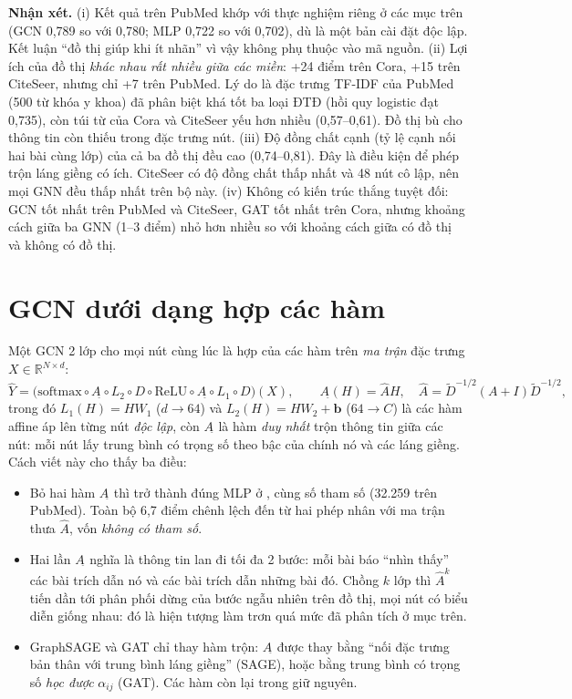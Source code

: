 \textbf{Nhận xét.} (i) Kết quả trên PubMed khớp với thực nghiệm riêng ở các mục trên (GCN 0,789 so với 0,780; MLP 0,722 so với 0,702), dù là một bản cài đặt độc lập. Kết luận ``đồ thị giúp khi ít nhãn'' vì vậy không phụ thuộc vào mã nguồn. (ii) Lợi ích của đồ thị \emph{khác nhau rất nhiều giữa các miền}: +24 điểm trên Cora, +15 trên CiteSeer, nhưng chỉ +7 trên PubMed. Lý do là đặc trưng TF-IDF của PubMed (500 từ khóa y khoa) đã phân biệt khá tốt ba loại ĐTĐ (hồi quy logistic đạt 0,735), còn túi từ của Cora và CiteSeer yếu hơn nhiều (0,57–0,61). Đồ thị bù cho thông tin còn thiếu trong đặc trưng nút. (iii) Độ đồng chất cạnh (tỷ lệ cạnh nối hai bài cùng lớp) của cả ba đồ thị đều cao (0,74–0,81). Đây là điều kiện để phép trộn láng giềng có ích. CiteSeer có độ đồng chất thấp nhất và 48 nút cô lập, nên mọi GNN đều thấp nhất trên bộ này. (iv) Không có kiến trúc thắng tuyệt đối: GCN tốt nhất trên PubMed và CiteSeer, GAT tốt nhất trên Cora, nhưng khoảng cách giữa ba GNN (1–3 điểm) nhỏ hơn nhiều so với khoảng cách giữa có đồ thị và không có đồ thị.

\section{GCN dưới dạng hợp các hàm}
\label{sec:ch6-compose}

Một GCN 2 lớp cho mọi nút cùng lúc là hợp của các hàm trên \emph{ma trận} đặc trưng $X\in\mathbb R^{N\times d}$:
\begin{equation}
\hat Y = \big(\mathrm{softmax}\circ A_{\hat{}}\circ L_2 \circ D \circ \mathrm{ReLU} \circ A_{\hat{}} \circ L_1 \circ D\big)(X),
\qquad A_{\hat{}}(H) = \hat A H,\quad \hat A = \tilde D^{-1/2}(A+I)\tilde D^{-1/2},
\label{eq:ch6-compose}
\end{equation}
trong đó $L_1(H)=HW_1$ ($d\to64$) và $L_2(H)=HW_2+\mathbf b$ ($64\to C$) là các hàm affine áp lên từng nút \emph{độc lập}, còn $A_{\hat{}}$ là hàm \emph{duy nhất} trộn thông tin giữa các nút: mỗi nút lấy trung bình có trọng số theo bậc của chính nó và các láng giềng. Cách viết này cho thấy ba điều:
\begin{itemize}
  \item Bỏ hai hàm $A_{\hat{}}$ thì  trở thành đúng MLP ở , cùng số tham số (32.259 trên PubMed). Toàn bộ 6,7 điểm chênh lệch đến từ hai phép nhân với ma trận thưa $\hat A$, vốn \emph{không có tham số}.
  \item Hai lần $A_{\hat{}}$ nghĩa là thông tin lan đi tối đa 2 bước: mỗi bài báo ``nhìn thấy'' các bài trích dẫn nó và các bài trích dẫn những bài đó. Chồng $k$ lớp thì $\hat A^k$ tiến dần tới phân phối dừng của bước ngẫu nhiên trên đồ thị, mọi nút có biểu diễn giống nhau: đó là hiện tượng làm trơn quá mức đã phân tích ở mục trên.
  \item GraphSAGE và GAT chỉ thay hàm trộn: $A_{\hat{}}$ được thay bằng ``nối đặc trưng bản thân với trung bình láng giềng'' (SAGE), hoặc bằng trung bình có trọng số \emph{học được} $\alpha_{ij}$ (GAT). Các hàm còn lại trong  giữ nguyên.
\end{itemize}

